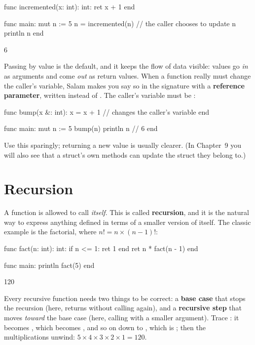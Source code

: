 \begin{salamen}
func incremented(x: int): int:
    ret x + 1
end

func main:
    mut n := 5
    n = incremented(n)     // the caller chooses to update n
    println n
end
\end{salamen}

\begin{progout}
6
\end{progout}

\begin{note}
Passing by value is the default, and it keeps the flow of data visible: values go
\emph{in} as arguments and come \emph{out} as return values. When a function
really must change the caller's variable, Salam makes you say so in the
signature with a \textbf{reference parameter}, written \code{\&:} instead of
\code{:}. The caller's variable must be :
\begin{salamen}
func bump(x &: int):
    x = x + 1              // changes the caller's variable
end

func main:
    mut n := 5
    bump(n)
    println n              // 6
end
\end{salamen}
Use this sparingly; returning a new value is usually clearer. (In Chapter~9 you
will also see that a struct's own methods can update the struct they belong to.)
\end{note}

\section{Recursion}

A function is allowed to call \emph{itself}. This is called \textbf{recursion},
and it is the natural way to express anything defined in terms of a smaller
version of itself. The classic example is the factorial, where
$n! = n \times (n-1)!$:

\begin{salamen}
func fact(n: int): int:
    if n <= 1:
        ret 1
    end
    ret n * fact(n - 1)
end

func main:
    println fact(5)
end
\end{salamen}

\begin{progout}
120
\end{progout}

Every recursive function needs two things to be correct: a \textbf{base case}
that stops the recursion (here,  returns  without calling
again), and a \textbf{recursive step} that moves \emph{toward} the base case
(here, calling  with a smaller argument). Trace :
it becomes , which becomes , and so on
down to , which is ; then the multiplications unwind:
$5\times4\times3\times2\times1 = 120$.

